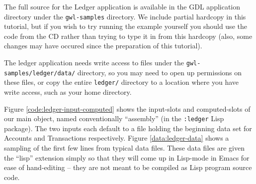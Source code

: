 \documentclass [11pt]{book}
\begin{document}
\label{sec:mainledgerobject}

The full source for the Ledger application is available in the GDL application directory under the \texttt{gwl-samples} directory. We include partial hardcopy in this tutorial, but if you wish to try running the example 
yourself you should use the code from the CD rather than trying to type it in from this hardcopy (also, 
some changes may have occured since the preparation of this tutorial). 

The ledger application needs write access to files under the \texttt{gwl-samples/ledger/data/} directory, so you may need to open up permissions on these files, or copy the entire \texttt{ledger/} directory to a location where you have write access, such as your home directory. 

Figure 
\ref{code:ledger-input-computed} shows the input-slots and computed-slots of our main object, named conventionally 
``assembly'' (in the \texttt{:ledger} Lisp package). The two inputs each default to a file holding the beginning 
data set for Accounts and Transactions respectively. Figure 
\ref{data:ledger-data} shows a sampling of the first few lines from typical data files. 
These data files are given the ``lisp'' extension simply so that they will 
come up in Lisp-mode in Emacs for ease of hand-editing -- they are not
meant to be compiled as Lisp program source code.
\end{document}
